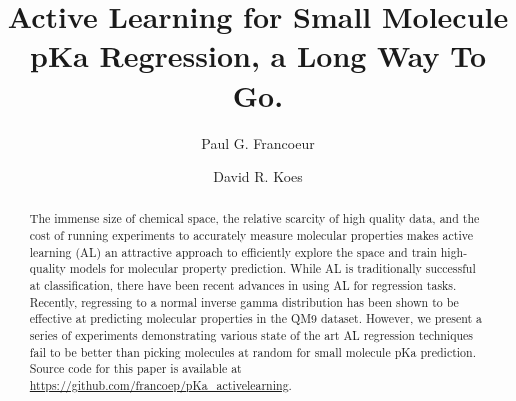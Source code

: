 \documentclass[journal=jmcmar,manuscript=article]{achemso}
\author{Paul G. Francoeur}
\author{David R. Koes}
\affiliation[Pitt]{Department of Computational and Systems Biology, University of Pittsburgh, Pittsburgh, PA 15260}
\title[AL for pKa]{Active Learning for Small Molecule pKa Regression, a Long Way To Go.}
\begin{document}





\begin{abstract}
The immense size of chemical space, the relative scarcity of high quality data, and the cost of running experiments to accurately measure molecular properties makes active learning (AL) an attractive approach to efficiently explore the space and train high-quality models for molecular property prediction.
While AL is traditionally successful at classification, there have been recent advances in using AL for regression tasks.
Recently, regressing to a normal inverse gamma distribution has been shown to be effective at predicting molecular properties in the QM9 dataset.
However, we present a series of experiments demonstrating various state of the art AL regression techniques fail to be better than picking molecules at random for small molecule pKa prediction.
Source code for this paper is available at \url{https://github.com/francoep/pKa_activelearning}.
\end{abstract}
\end{document}

